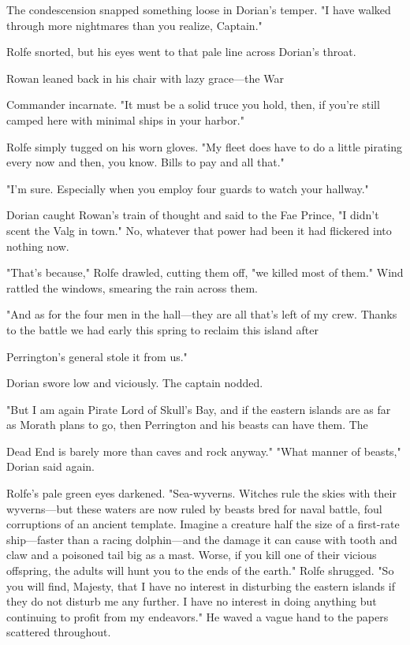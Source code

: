 The condescension snapped something loose in Dorian's temper. "I have walked through more nightmares than you realize, Captain."

Rolfe snorted, but his eyes went to that pale line across Dorian's throat.

Rowan leaned back in his chair with lazy grace---the War

Commander incarnate. "It must be a solid truce you hold, then, if you're still camped here with minimal ships in your harbor."

Rolfe simply tugged on his worn gloves. "My fleet does have to do a little pirating every now and then, you know. Bills to pay and all that."

"I'm sure. Especially when you employ four guards to watch your hallway."

Dorian caught Rowan's train of thought and said to the Fae Prince, "I didn't scent the Valg in town." No, whatever that power had been
 it had flickered into nothing now.

"That's because," Rolfe drawled, cutting them off, "we killed most of them." Wind rattled the windows, smearing the rain across them.

"And as for the four men in the hall---they are all that's left of my crew. Thanks to the battle we had early this spring to reclaim this island after

Perrington's general stole it from us."

Dorian swore low and viciously. The captain nodded.

"But I am again Pirate Lord of Skull's Bay, and if the eastern islands are as far as Morath plans to go, then Perrington and his beasts can have them. The

Dead End is barely more than caves and rock anyway." "What manner of beasts," Dorian said again.

Rolfe's pale green eyes darkened. "Sea-wyverns. Witches rule the skies with their wyverns---but these waters are now ruled by beasts bred for naval battle, foul corruptions of an ancient template. Imagine a creature half the size of a first-rate ship---faster than a racing dolphin---and the damage it can cause with tooth and claw and a poisoned tail big as a mast. Worse, if you kill one of their vicious offspring, the adults will hunt you to the ends of the earth." Rolfe shrugged. "So you will find, Majesty, that I have no interest in disturbing the eastern islands if they do not disturb me any further. I have no interest in doing anything but continuing to profit from my endeavors." He waved a vague hand to the papers scattered throughout.

